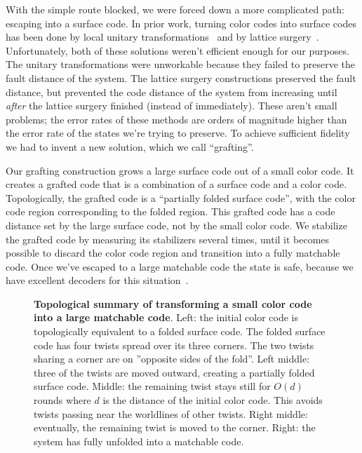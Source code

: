\documentclass[onecolumn,unpublished,a4paper]{quantumarticle}
\theoremstyle{definition}
\begin{document}
With the simple route blocked, we were forced down a more complicated path: escaping into a surface code.
In prior work, turning color codes into surface codes has been done by local unitary transformations~\cite{kubicacolor2surface,itogawa2024zeroleveldistilldistill} and by lattice surgery~\cite{poulsennautrup2017,shutty2022mergedcolorcode,itogawa2024zeroleveldistilldistill}.
Unfortunately, both of these solutions weren't efficient enough for our purposes.
The unitary transformations were unworkable because they failed to preserve the fault distance of the system.
The lattice surgery constructions preserved the fault distance, but prevented the code distance of the system from increasing until \emph{after} the lattice surgery finished (instead of immediately).
These aren't small problems; the error rates of these methods are orders of magnitude higher than the error rate of the states we're trying to preserve.
To achieve sufficient fidelity we had to invent a new solution, which we call ``grafting''.

Our grafting construction grows a large surface code out of a small color code.
It creates a grafted code that is a combination of a surface code and a color code.
Topologically, the grafted code is a ``partially folded surface code'', with the color code region corresponding to the folded region.
This grafted code has a code distance set by the large surface code, not by the small color code.
We stabilize the grafted code by measuring its stabilizers several times, until it becomes possible to discard the color code region and transition into a fully matchable code.
Once we've escaped to a large matchable code the state is safe, because we have excellent decoders for this situation~\cite{higgott2021pymatching,paler2023correlated,gidney2024yoked}.

\begin{figure}
    \centering
    \caption{
        \textbf{Topological summary of transforming a small color code into a large matchable code}.
        Left: the initial color code is topologically equivalent to a folded surface code.
        The folded surface code has four twists spread over its three corners.
        The two twists sharing a corner are on ''opposite sides of the fold''.
        Left middle: three of the twists are moved outward, creating a partially folded surface code.
        Middle: the remaining twist stays still for $O(d)$ rounds where $d$ is the distance of the initial color code.
        This avoids twists passing near the worldlines of other twists.
        Right middle: eventually, the remaining twist is moved to the corner.
        Right: the system has fully unfolded into a matchable code.
    }
    \label{fig:topological-growth}
\end{figure}
\end{document}

